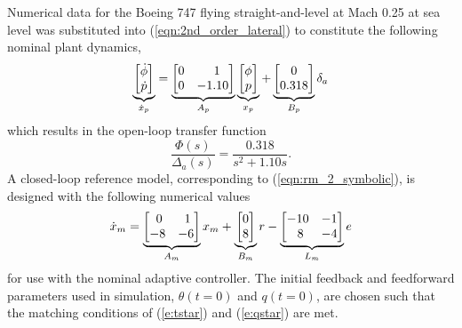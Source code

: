 Numerical data for the Boeing 747 flying straight-and-level at Mach 0.25 at sea level \cite{heffley1972aircraft} was substituted into (\ref{eqn:2nd_order_lateral}) to constitute the following nominal plant dynamics,
\begin{equation}
		\underbrace{\begin{bmatrix}
			\dot{\phi} \\ \dot{p}
		\end{bmatrix}}_{\dot{x}_p} = \underbrace{\begin{bmatrix}
			0 & \hfil 1 \\ 0 & -1.10
		\end{bmatrix}}_{A_p} \underbrace{\begin{bmatrix}
			\phi \\ p
		\end{bmatrix}}_{x_p} + \underbrace{\begin{bmatrix}
			0 \\ 0.318
		\end{bmatrix}}_{B_p} \delta_a \label{eqn:siso_plant_nominal_num}
\end{equation} \noindent which results in the open-loop transfer function 
\begin{equation}
		\frac{\Phi(s)}{\Delta_a(s)} = \frac{0.318}{s^2 + 1.10s}. 
\end{equation}
A closed-loop reference model, corresponding to (\ref{eqn:rm_2_symbolic}), is designed with the following numerical values
\begin{equation}
	\dot{x}_m = \underbrace{\begin{bmatrix}
		\hfil 0 & \hfil 1\\ -8 & -6
	\end{bmatrix}}_{A_m} x_m + \underbrace{\begin{bmatrix}
		0 \\ 8
	\end{bmatrix}}_{B_m} r - \underbrace{\begin{bmatrix}
		\hfil -10 & \hfil -1 \\ \hfil 8 & \hfil -4
	\end{bmatrix}}_{L_m} e
	\label{eqn:rm_2}
\end{equation}
\noindent for use with the nominal adaptive controller. The initial feedback and feedforward parameters used in simulation, $\theta(t=0)$ and $q(t=0)$, are chosen such that the matching conditions of (\ref{e:tstar}) and (\ref{e:qstar}) are met.

